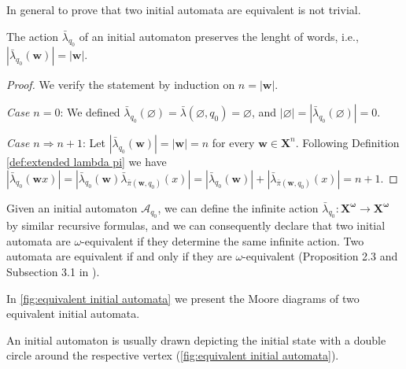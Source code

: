 \documentclass[mat1]{fmfdeloTS2.0}
\newcommand{\obs}{}				%
\newcommand{\word}{\mathbf}				%
\newcommand{\abece}{\mathbf{X}}			%
\newcommand{\infslovar}{\mathbf{X^\omega}}		%
\newcommand{\auto}{\mathcal}			%
\newcommand{\PI}{\bar{\pi}}			%
\newcommand{\LAMBDA}{\bar{\lambda}}			%
\begin{document}
In general to prove that two initial automata are equivalent is not trivial.

\begin{proposition}\label{prop:lenght-preserving}
The action $\LAMBDA_{q_0}$ of an initial automaton preserves the lenght of words, i.e., $|\LAMBDA_{q_0}(\word{w})|=|\word{w}|$.
\end{proposition}
\begin{proof}
We verify the statement by induction on $n=|\word{w}|$.

\emph{Case $n=0$}: We defined $\LAMBDA_{q_0}(\varnothing)=\LAMBDA(\varnothing,q_0)=\varnothing$, and $|\varnothing|=|\LAMBDA_{q_0}(\varnothing)|=0$.

\emph{Case $n\Rightarrow n+1$}: Let $|\LAMBDA_{q_0}(\word{w})|=|\word{w}|=n$ for every $\word{w}\in\abece^n$. Following Definition \autoref{def:extended lambda pi} we have $|\LAMBDA_{q_0}(\word{w}x)|=|\LAMBDA_{q_0}(\word{w})\LAMBDA_{\PI(\word{w},q_0)}(x)|=|\LAMBDA_{q_0}(\word{w})|+|\LAMBDA_{\PI(\word{w},q_0)}(x)|=n+1$.
\end{proof}

\begin{remark}
Given an initial automaton $\auto{A}_{q_0}$, we can define the \obs{infinite action $\LAMBDA_{q_0}:\infslovar\longrightarrow\infslovar$} by similar recursive formulas, and we can consequently declare that two initial automata are \obs{$\omega$-equivalent} if they determine the same infinite action. Two automata are equivalent \obs{if and only if} they are $\omega$-equivalent (Proposition 2.3 and Subsection 3.1 in \cite{5}).
\label{equivalence of automata}
\end{remark}

\begin{example}
In \autoref{fig:equivalent initial automata} we present the Moore diagrams of two equivalent initial automata.
\end{example}

\begin{remark}
An initial automaton is usually drawn depicting the initial state with a double circle around the respective vertex (\autoref{fig:equivalent initial automata}).
\end{remark}
\end{document}
